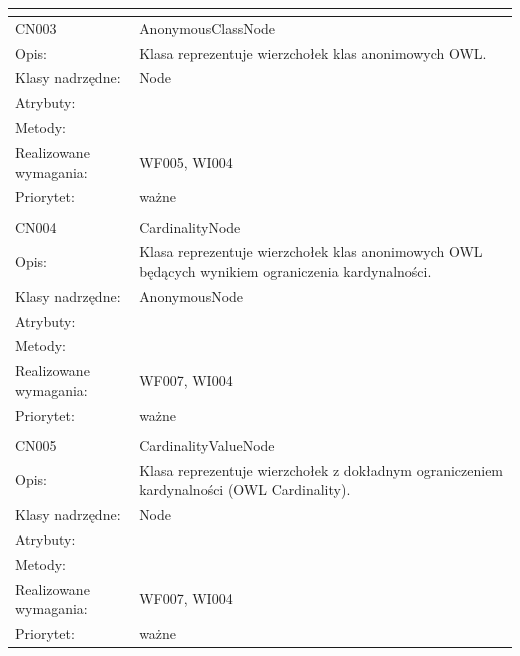 \documentclass[a4paper,10pt]{article}
\begin{document}
\begin{center}
\begin{longtable}{|m{3cm}|m{9cm}|}
\multicolumn{2}{c}{} \\
 \hline

CN003 & AnonymousClassNode \\ \hline
Opis: & Klasa reprezentuje wierzchołek klas anonimowych OWL.    \\ \hline
Klasy nadrzędne: & Node     \\ \hline
Atrybuty: & %
 \\ \hline
Metody: & %
  \\ \hline
Realizowane wymagania: & WF005, WI004 \\ \hline
Priorytet: & ważne \\ \hline

\multicolumn{2}{c}{} \\
 \hline

CN004 & CardinalityNode \\ \hline
Opis: & Klasa reprezentuje wierzchołek klas anonimowych OWL będących wynikiem ograniczenia kardynalności.    \\ \hline
Klasy nadrzędne: & AnonymousNode     \\ \hline
Atrybuty: & %
 \\ \hline
Metody: & %
  \\ \hline
Realizowane wymagania: & WF007, WI004 \\ \hline
Priorytet: & ważne  \\ \hline

\multicolumn{2}{c}{} \\
 \hline

CN005 & CardinalityValueNode \\ \hline
Opis: & Klasa reprezentuje wierzchołek z dokładnym ograniczeniem kardynalności (OWL Cardinality). \\ \hline
Klasy nadrzędne: & Node     \\ \hline
Atrybuty: & %
 \\ \hline
Metody: & %
  \\ \hline
Realizowane wymagania: & WF007, WI004 \\ \hline
Priorytet: & ważne  \\ \hline


\end{longtable}
\end{center}
\end{document}
